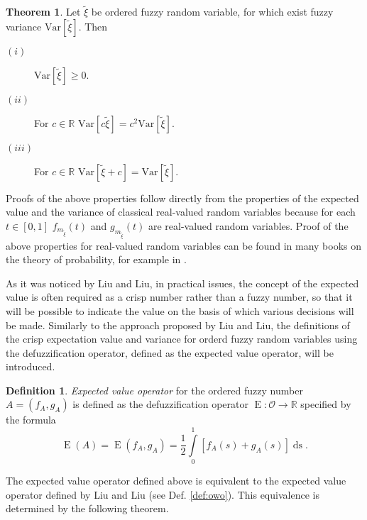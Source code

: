\documentclass[review]{elsarticle}
\theoremstyle{definition}
\newtheorem{definition}{Definition}
\theoremstyle{theorem}
\newtheorem{theorem}{Theorem}
\DeclareMathOperator*{\ds}{ds}
\DeclareMathOperator*{\E}{E}
\begin{document}
\begin{theorem}
Let $\tilde{\xi}$ be ordered fuzzy random variable, for which exist fuzzy variance $\mathrm{Var}[\tilde{\xi}]$. Then
\begin{description}
\item[$(i)$] $\mathrm{Var}[\tilde{\xi}]\geq 0$.
\item[$(ii)$] For $c\in\mathbb{R}$ $\mathrm{Var}[c\tilde{\xi}]=c^2\mathrm{Var}[\tilde{\xi}]$.
\item[$(iii)$] For $c\in\mathbb{R}$ $\mathrm{Var}[\tilde{\xi} + c]=\mathrm{Var}[\tilde{\xi}]$.
\end{description} 
\end{theorem}

Proofs of the above properties follow directly from the properties of the expected value and the variance of classical real-valued random variables because for each $t\in[0,1]$ $f_{m_{\tilde{\xi}}}(t)$ and $g_{m_{\tilde{\xi}}}(t)$ are real-valued random variables. Proof of the above properties for real-valued random variables can be found in many books on the theory of probability, for example in \cite{prob2003}.

As it was noticed by Liu and Liu, in practical issues, the concept of the expected value is often required as a crisp number rather than a fuzzy number, so that it will be possible to indicate the value on the basis of which various decisions will be made. Similarly to the approach proposed by Liu and Liu, the definitions of the crisp expectation value and variance for orderd fuzzy random variables using the defuzzification operator, defined as the expected value operator, will be introduced.

\begin{definition}
{\it Expected value operator} for the ordered fuzzy number \linebreak $ A = (f_A, g_A) $ is defined as the defuzzification operator $ \E \colon \mathcal{O} \to \mathbb{R} $ specified by the formula
\begin{equation}
\E(A)=\E(f_A,g_A)=\frac{1}{2}\int\limits_0^1[f_A(s)+g_A(s)]\ds.
\end{equation}  
\end{definition}

The expected value operator defined above is equivalent to the expected value operator defined by Liu and Liu (see Def. \ref{def:owo}). This equivalence is determined by the following theorem.
\end{document}
